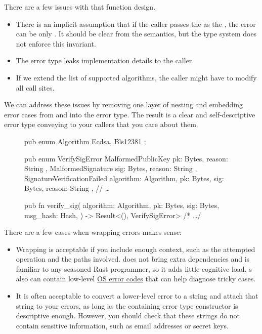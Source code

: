 \documentclass{article}
\begin{document}
There are a few issues with that  function design.
\begin{itemize}
  \item
    There is an implicit assumption that if the caller passes the  as the , the error can be only .
    It should be clear from the semantics, but the type system does not enforce this invariant.
  \item
    The error type leaks implementation details to the caller.
  \item
    If we extend the list of supported algorithms, the caller might have to modify all call sites.
\end{itemize}

We can address these issues by removing one layer of nesting and embedding error cases from  and  into the  error type.
The result is a clear and self-descriptive error type conveying to your callers that you care about them.

\begin{figure}
\begin{code}[good]
pub enum Algorithm { Ecdsa, Bls12381 };

pub enum VerifySigError {
  MalformedPublicKey { pk: Bytes, reason: String },
  MalformedSignature { sig: Bytes, reason: String },
  SignatureVerificationFailed {
    algorithm: Algorithm,
    pk: Bytes,
    sig: Bytes,
    reason: String
  },
  // \ldots
}

pub fn verify_sig(
  algorithm: Algorithm,
  pk: Bytes,
  sig: Bytes,
  msg_hash: Hash,
) -> Result<(), VerifySigError> { /* \ldots  */ }
\end{code}
\end{figure}

There are a few cases when wrapping errors makes sense:
\begin{itemize}
  \item
    Wrapping  is acceptable if you include enough context, such as the attempted operation and the paths involved.
     does not bring extra dependencies and is familiar to any seasoned Rust programmer, so it adds little cognitive load.
    s also can contain low-level \href{https://doc.rust-lang.org/std/io/struct.Error.html#method.raw_os_error}{OS error codes} that can help diagnose tricky cases.
  \item
    It is often acceptable to convert a lower-level error to a string and attach that string to your errors, as long as the containing error type constructor is descriptive enough.
    However, you should check that these strings do not contain sensitive information, such as email addresses or secret keys.
\end{itemize}
\end{document}
